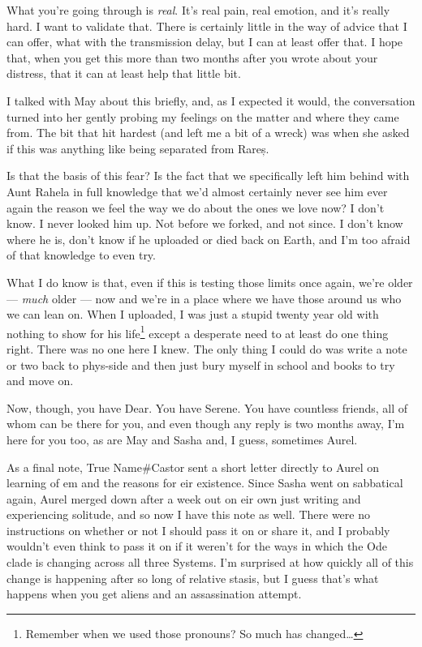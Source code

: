 What you're going through is \emph{real}. It's real pain, real emotion, and it's really hard. I want to validate that. There is certainly little in the way of advice that I can offer, what with the transmission delay, but I can at least offer that. I hope that, when you get this more than two months after you wrote about your distress, that it can at least help that little bit.

I talked with May about this briefly, and, as I expected it would, the conversation turned into her gently probing my feelings on the matter and where they came from. The bit that hit hardest (and left me a bit of a wreck) was when she asked if this was anything like being separated from Rareș.

Is that the basis of this fear? Is the fact that we specifically left him behind with Aunt Rahela in full knowledge that we'd almost certainly never see him ever again the reason we feel the way we do about the ones we love now? I don't know. I never looked him up. Not before we forked, and not since. I don't know where he is, don't know if he uploaded or died back on Earth, and I'm too afraid of that knowledge to even try.

What I do know is that, even if this is testing those limits once again, we're older — \emph{much} older — now and we're in a place where we have those around us who we can lean on. When I uploaded, I was just a stupid twenty year old with nothing to show for his life\footnote{Remember when we used those pronouns? So much has changed\ldots{}} except a desperate need to at least do one thing right. There was no one here I knew. The only thing I could do was write a note or two back to phys-side and then just bury myself in school and books to try and move on.

Now, though, you have Dear. You have Serene. You have countless friends, all of whom can be there for you, and even though any reply is two months away, I'm here for you too, as are May and Sasha and, I guess, sometimes Aurel.

As a final note, True Name\#Castor sent a short letter directly to Aurel on learning of em and the reasons for eir existence. Since Sasha went on sabbatical again, Aurel merged down after a week out on eir own just writing and experiencing solitude, and so now I have this note as well. There were no instructions on whether or not I should pass it on or share it, and I probably wouldn't even think to pass it on if it weren't for the ways in which the Ode clade is changing across all three Systems. I'm surprised at how quickly all of this change is happening after so long of relative stasis, but I guess that's what happens when you get aliens and an assassination attempt.

